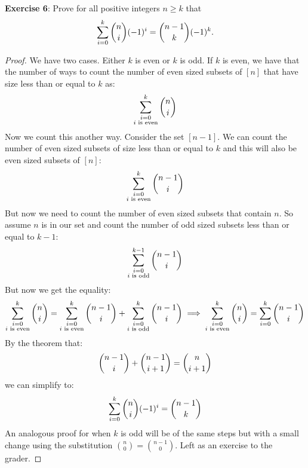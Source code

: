 \documentclass{article}
\begin{document}
\textbf{Exercise 6}: Prove for all positive integers $n \geq k$ that
    \begin{equation*}
        \sum_{i = 0}^{k} \dbinom{n}{i}(-1)^{i} = \dbinom{n - 1}{k}(-1)^{k}.
    \end{equation*}
\begin{proof}
    We have two cases. Either $k$ is even or $k$ is odd. If $k$ is even, we have that the number of ways to count the number of even sized subsets of $[n]$ that have size less than or equal to $k$ as:
        \begin{equation*}
            \sum_{\substack{i = 0 \\ i \text{ is even}}}^{k} \dbinom{n}{i}
        \end{equation*}
    Now we count this another way. Consider the set $[n - 1]$. We can count the number of even sized subsets of size less than or equal to $k$ and this will also be even sized subsets of $[n]$:
        \begin{equation*}
            \sum_{\substack{i = 0 \\ i \text{ is even}}}^{k} \dbinom{n - 1}{i}
        \end{equation*}
    But now we need to count the number of even sized subsets that contain $n$. So assume $n$ is in our set and count the number of odd sized subsets less than or equal to $k - 1$:
        \begin{equation*}
            \sum_{\substack{i = 0 \\ i \text{ is odd}}}^{k - 1} \dbinom{n - 1}{i}
        \end{equation*}
    But now we get the equality:
        \begin{equation*}
            \sum_{\substack{i = 0 \\ i \text{ is even}}}^{k} \dbinom{n}{i} = \sum_{\substack{i = 0 \\ i \text{ is even}}}^{k} \dbinom{n - 1}{i} + \sum_{\substack{i = 0 \\ i \text{ is odd}}}^{k} \dbinom{n - 1}{i} \implies \sum_{\substack{i = 0 \\ i \text{ is even}}}^{k} \dbinom{n}{i} = \sum_{i = 0}^{k} \dbinom{n - 1}{i}
        \end{equation*}
    By the theorem that:
        \begin{equation*}
            \dbinom{n - 1}{i} + \dbinom{n - 1}{i + 1} = \dbinom{n}{i + 1}
        \end{equation*}
    we can simplify to:
        \begin{equation*}
            \sum_{i = 0}^{k} \dbinom{n}{i}(-1)^{i} = \dbinom{n - 1}{k}
        \end{equation*}
    An analogous proof for when $k$ is odd will be of the same steps but with a small change using the substitution $\binom{n}{0} = \binom{n - 1}{0}$. Left as an exercise to the grader.
\end{proof}
\end{document}
